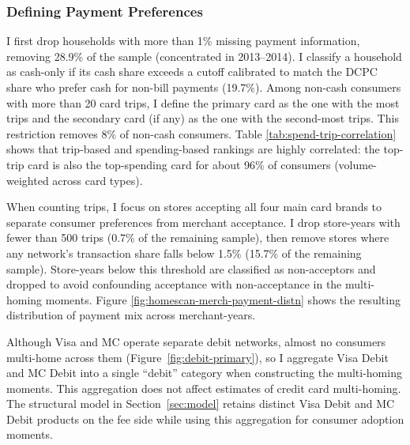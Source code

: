 \documentclass[main.tex]{subfiles}
\begin{document}
\subsubsection{Defining Payment Preferences}

I first drop households with more than 1\% missing payment information, removing 28.9\% of the sample (concentrated in 2013--2014).
I classify a household as cash-only if its cash share exceeds a cutoff calibrated to match the DCPC share who prefer cash for non-bill payments (19.7\%).
Among non-cash consumers with more than 20 card trips, I define the primary card as the one with the most trips and the secondary card (if any) as the one with the second-most trips.
This restriction removes 8\% of non-cash consumers.
Table \ref{tab:spend-trip-correlation} shows that trip-based and spending-based rankings are highly correlated: the top-trip card is also the top-spending card for about 96\% of consumers (volume-weighted across card types).

When counting trips, I focus on stores accepting all four main card brands to separate consumer preferences from merchant acceptance.
I drop store-years with fewer than 500 trips (0.7\% of the remaining sample), then remove stores where any network's transaction share falls below 1.5\% (15.7\% of the remaining sample).
Store-years below this threshold are classified as non-acceptors and dropped to avoid confounding acceptance with non-acceptance in the multi-homing moments.
Figure \ref{fig:homescan-merch-payment-distn} shows the resulting distribution of payment mix across merchant-years.

Although Visa and MC operate separate debit networks, almost no consumers multi-home across them (Figure~\ref{fig:debit-primary}), so I aggregate Visa Debit and MC Debit into a single ``debit'' category when constructing the multi-homing moments. This aggregation does not affect estimates of credit card multi-homing. The structural model in Section~\ref{sec:model} retains distinct Visa Debit and MC Debit products on the fee side while using this aggregation for consumer adoption moments.
\end{document}
